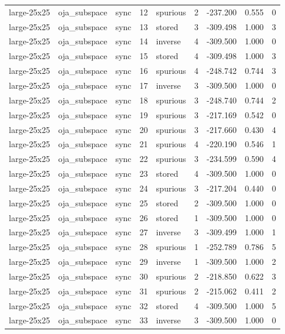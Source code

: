 \begin{tabular}{lllrlrrrr}
large-25x25 & oja\_subspace & sync & 12 & spurious & 2 & -237.200 & 0.555 & 0 \\
large-25x25 & oja\_subspace & sync & 13 & stored & 3 & -309.498 & 1.000 & 3 \\
large-25x25 & oja\_subspace & sync & 14 & inverse & 4 & -309.500 & 1.000 & 0 \\
large-25x25 & oja\_subspace & sync & 15 & stored & 4 & -309.498 & 1.000 & 3 \\
large-25x25 & oja\_subspace & sync & 16 & spurious & 4 & -248.742 & 0.744 & 3 \\
large-25x25 & oja\_subspace & sync & 17 & inverse & 3 & -309.500 & 1.000 & 0 \\
large-25x25 & oja\_subspace & sync & 18 & spurious & 3 & -248.740 & 0.744 & 2 \\
large-25x25 & oja\_subspace & sync & 19 & spurious & 3 & -217.169 & 0.542 & 0 \\
large-25x25 & oja\_subspace & sync & 20 & spurious & 3 & -217.660 & 0.430 & 4 \\
large-25x25 & oja\_subspace & sync & 21 & spurious & 4 & -220.190 & 0.546 & 1 \\
large-25x25 & oja\_subspace & sync & 22 & spurious & 3 & -234.599 & 0.590 & 4 \\
large-25x25 & oja\_subspace & sync & 23 & stored & 4 & -309.500 & 1.000 & 0 \\
large-25x25 & oja\_subspace & sync & 24 & spurious & 3 & -217.204 & 0.440 & 0 \\
large-25x25 & oja\_subspace & sync & 25 & stored & 2 & -309.500 & 1.000 & 0 \\
large-25x25 & oja\_subspace & sync & 26 & stored & 1 & -309.500 & 1.000 & 0 \\
large-25x25 & oja\_subspace & sync & 27 & inverse & 3 & -309.499 & 1.000 & 1 \\
large-25x25 & oja\_subspace & sync & 28 & spurious & 1 & -252.789 & 0.786 & 5 \\
large-25x25 & oja\_subspace & sync & 29 & inverse & 1 & -309.500 & 1.000 & 2 \\
large-25x25 & oja\_subspace & sync & 30 & spurious & 2 & -218.850 & 0.622 & 3 \\
large-25x25 & oja\_subspace & sync & 31 & spurious & 2 & -215.062 & 0.411 & 2 \\
large-25x25 & oja\_subspace & sync & 32 & stored & 4 & -309.500 & 1.000 & 5 \\
large-25x25 & oja\_subspace & sync & 33 & inverse & 3 & -309.500 & 1.000 & 0 \\

\end{tabular}
